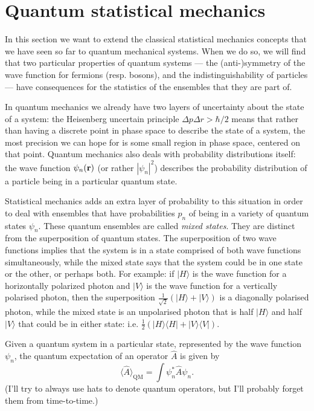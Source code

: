 \section{Quantum statistical mechanics}

\newcommand{\bra}[1]{\langle #1 |}
\newcommand{\ket}[1]{| #1 \rangle}
\newcommand{\braket}[2]{\langle #1 | #2\rangle}

In this section we want to extend the classical statistical mechanics concepts that we have seen so far to quantum mechanical systems. When we do so, we will find that two particular properties of quantum systems --- the (anti-)symmetry of the wave function for fermions (resp. bosons), and the indistinguishability of particles --- have consequences for the statistics of the ensembles that they are part of.

In quantum mechanics we already have two layers of uncertainty about the state of a system: the Heisenberg uncertain principle $\Delta{p}\Delta {r}>{\hbar}/{2}$ means that rather than having a discrete point in phase space to describe the state of a system, the most precision we can hope for is some small region in phase space, centered on that point. Quantum mechanics also deals with probability distributions itself: the wave function $\psi_n({\bf r})$ (or rather $|\psi_n|^2$) describes the probability distribution of a particle being in a particular quantum state.

Statistical mechanics adds an extra layer of probability to this situation in order to deal with ensembles that have probabilities $p_n$ of being in a variety of quantum states $\psi_n$. These quantum ensembles are called \emph{mixed states}. They are distinct from the superposition of quantum states. The superposition of two wave functions implies that the system is in a state comprised of both wave functions simultaneously, while the mixed state says that the system could be in one state or the other, or perhaps both. For example: if $\ket{H}$
is the wave function for a horizontally polarized photon and $\ket{V}$ is the wave function for a vertically polarised photon, then the superposition $\frac{1}{\sqrt{2}}(\ket{H}+\ket{V})$ is a diagonally polarised photon, while the mixed state is an unpolarised photon that is half $\ket{H}$ and half $\ket{V}$ that could be in either state:  i.e. $\frac12\left(\ket{H}\bra{H}+\ket{V}\bra{V}\right)$.

Given a quantum system in a particular state, represented by the wave function $\psi_n$, the quantum expectation of an operator $\hat{A}$ is given by
$$
	\langle\hat{A}\rangle_\text{QM} = \int\psi^*_n\hat{A}\psi_n.
$$
(I'll try to always use hats to denote quantum operators, but I'll probably forget them from time-to-time.)

